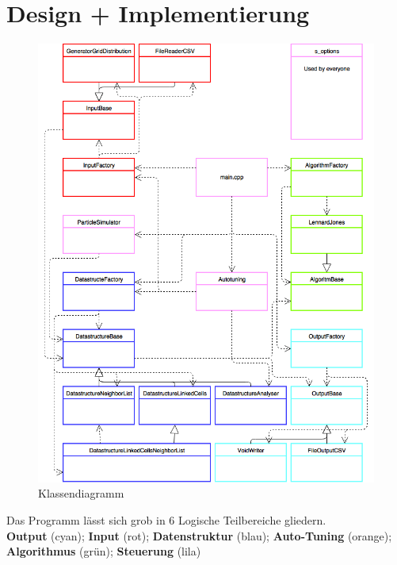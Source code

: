 \documentclass[
12pt,
a4paper,
BCOR10mm,
DIV14,
headsepline,
]{scrreprt}
\begin{document}
	\section{Design + Implementierung}
	\begin{figure}[h]
		\centering
		\includegraphics[height=0.6\textheight]{ClassDiagram.png}
		\caption{Klassendiagramm}
		\label{figure:Klassendiagramm}
	\end{figure}
	Das Programm lässt sich grob in 6 Logische Teilbereiche gliedern.\\
	\textbf{Output} (cyan); \textbf{Input} (rot); \textbf{Datenstruktur} (blau); \textbf{Auto-Tuning} (orange); \textbf{Algorithmus} (grün); \textbf{Steuerung} (lila)
	\newpage
\end{document}
